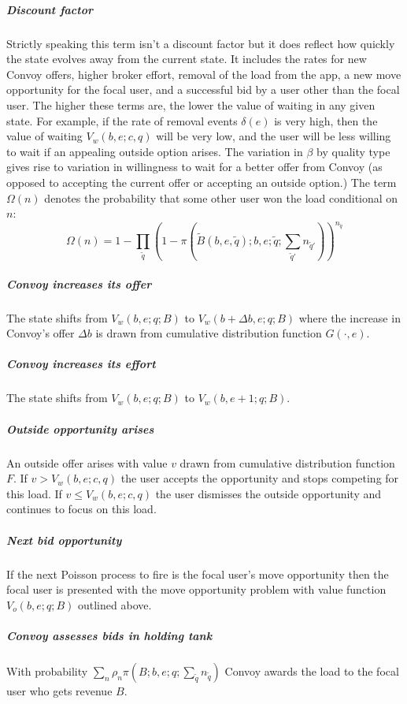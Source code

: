 \documentclass[12pt]{article}
\begin{document}
\subparagraph{Discount factor}
Strictly speaking this term isn't a discount factor but it does reflect how quickly the state evolves away from the current state. It includes the rates for new Convoy offers, higher broker effort, removal of the load from the app, a new move opportunity for the focal user, and a successful bid by a user other than the focal user. The higher these terms are, the lower the value of waiting in any given state. For example, if the rate of removal events $\delta\left(e\right)$ is very high, then the value of waiting $V_w\left(b,e;c,q\right)$ will be very low, and the user will be less willing to wait if an appealing outside option arises. The variation in $\beta$ by quality type gives rise to variation in willingness to wait for a better offer from Convoy (as opposed to accepting the current offer or accepting an outside option.) The term $\Omega\left(n\right)$ denotes the probability that some other user won the load conditional on $n$:
\begin{equation*}
    \Omega\left(n\right) = 1 - \prod_{\tilde{q}} \left(1-\pi\left(\tilde{B}\left(b,e,\tilde{q}\right); b, e; \tilde{q}; \sum_{\tilde{q}'} n_{\tilde{q}'} \right)\right)^{n_{\tilde{q}}}
\end{equation*}

\subparagraph{Convoy increases its offer}
The state shifts from $V_w\left(b,e;q;B\right)$ to $V_w\left(b+\Delta b,e;q;B\right)$ where the increase in Convoy's offer $\Delta b$ is drawn from cumulative distribution function $G\left(\cdot, e\right)$.

\subparagraph{Convoy increases its effort}
The state shifts from $V_w\left(b,e;q;B\right)$ to $V_w\left(b,e+1;q;B\right)$.

\subparagraph{Outside opportunity arises}
An outside offer arises with value $v$ drawn from cumulative distribution function $F$. If $v > V_w\left(b,e;c,q\right)$ the user accepts the opportunity and stops competing for this load. If $v \leq V_w\left(b,e;c,q\right)$ the user dismisses the outside opportunity and continues to focus on this load.

\subparagraph{Next bid opportunity}
If the next Poisson process to fire is the focal user's move opportunity then the focal user is presented with the move opportunity problem with value function $V_o\left(b,e;q;B\right)$ outlined above.

\subparagraph{Convoy assesses bids in holding tank}
With probability $\sum_n \rho_n  \pi\left(B; b, e; q; \sum_{\tilde{q}} n_{\tilde{q}}\right)$ Convoy awards the load to the focal user who gets revenue $B$.
\end{document}

